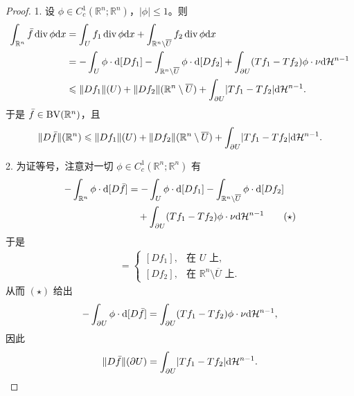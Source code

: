 \documentclass[../../main.tex]{subfiles}%
\begin{document}
\begin{proof}
1. 设 $\phi\in C_c^1(\mathbb{R}^n;\mathbb{R}^n)$，$\lvert\phi\rvert\leqslant1$。则
\begin{align*}
\int_{\mathbb{R}^n}\bar f\operatorname{div}\phi\mathrm{d} x
&=\int_U f_1\operatorname{div}\phi\mathrm{d} x+\int_{\mathbb{R}^n\setminus\overline{U}}f_2\operatorname{div}\phi\mathrm{d} x\\
&=-\int_U\phi\cdot\mathrm{d}[Df_1]-\int_{\mathbb{R}^n\setminus\overline{U}}\phi\cdot\mathrm{d}[Df_2]+\int_{\partial U}(Tf_1-Tf_2)\phi\cdot\nu\mathrm{d}\mathcal{H}^{n-1}\\
&\leqslant\lVert Df_1\rVert(U)+\lVert Df_2\rVert(\mathbb{R}^n\setminus\overline{U})+\int_{\partial U}\lvert Tf_1-Tf_2\rvert\mathrm{d}\mathcal{H}^{n-1}.
\end{align*}
于是 $\bar f\in\mathrm{BV}(\mathbb{R}^n)$，且
\begin{align*}
\lVert D\bar f\rVert(\mathbb{R}^n)\leqslant\lVert Df_1\rVert(U)+\lVert Df_2\rVert(\mathbb{R}^n\setminus\overline{U})+\int_{\partial U}\lvert Tf_1-Tf_2\rvert\mathrm{d}\mathcal{H}^{n-1}.
\end{align*}

2. 为证等号，注意对一切 $\phi\in C_c^1(\mathbb{R}^n;\mathbb{R}^n)$ 有
\begin{align*}
-\int_{\mathbb{R}^n}\phi\cdot\mathrm{d}[D\bar f]
&=-\int_U\phi\cdot\mathrm{d}[Df_1]-\int_{\mathbb{R}^n\setminus\overline{U}}\phi\cdot\mathrm{d}[Df_2]\\
&\quad+\int_{\partial U}(Tf_1-Tf_2)\phi\cdot\nu\mathrm{d}\mathcal{H}^{n-1}\qquad(\star)
\end{align*}
于是
\begin{align*}
[D\bar f]=
\begin{cases}
[Df_1], & \text{在 }U\text{ 上},\\
[Df_2], & \text{在 }\mathbb{R}^n\setminus\overline{U}\text{ 上}.
\end{cases}
\end{align*}
从而 $(\star)$ 给出
\begin{align*}
-\int_{\partial U}\phi\cdot\mathrm{d}[D\bar f]=\int_{\partial U}(Tf_1-Tf_2)\phi\cdot\nu\mathrm{d}\mathcal{H}^{n-1},
\end{align*}
因此
\begin{align*}
\lVert D\bar f\rVert(\partial U)=\int_{\partial U}\lvert Tf_1-Tf_2\rvert\mathrm{d}\mathcal{H}^{n-1}.
\end{align*}
\end{proof}
\end{document}
